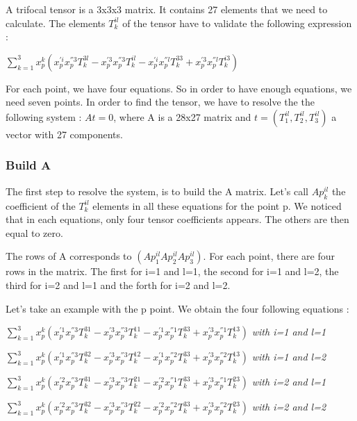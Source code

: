 \documentclass{report}
\begin{document}
A trifocal tensor is a 3x3x3 matrix. It contains 27 elements that we need to calculate. The elements $T_{k}^{il}$ of the tensor have to validate the following expression : 
\begin{center}
 $ \displaystyle { \sum_{k = 1}^{3}} x_{p}^{k}(x_{p}^{'i}x_{p}^{''3}T_{k}^{3l} - x_{p}^{'3}x_{p}^{''3}T_{k}^{il} - x_{p}^{'i}x_{p}^{''l}T_{k}^{33} + x_{p}^{'3}x_{p}^{''l}T_{k}^{i3})$ 
\end{center}
For each point, we have four equations. So in order to have enough equations, we need seven points. 
In order to find the tensor, we have to resolve the the following system : $At = 0$, where A is a 28x27 matrix and $t = ( T_{1}^{il}, T_{2}^{il}, T_{3}^{il})$ a vector with 27 components.

\subsubsection{Build A}
The first step to resolve the system, is to build the A matrix. Let's call $Ap_{k}^{il}$ the coefficient of the $T_{k}^{il}$ elements in all these equations for the point p. We noticed that in each equations, only four tensor coefficients appears. The others are then equal to zero. 

The rows of A corresponds to $( Ap_{1}^{il}  Ap_{2}^{il}  Ap_{3}^{il} )$.
For each point, there are four rows in the matrix. The first for i=1 and l=1, the second for i=1 and l=2, the third for i=2 and l=1 and the forth for i=2 and l=2.


Let's take an example with the p point. 
We obtain the four following equations : 
\begin{center}
 $ \displaystyle { \sum_{k = 1}^{3}} x_{p}^{k}(x_{p}^{'1}x_{p}^{''3}T_{k}^{31} - x_{p}^{'3}x_{p}^{''3}T_{k}^{11} - x_{p}^{'1}x_{p}^{''1}T_{k}^{33} + x_{p}^{'3}x_{p}^{''1}T_{k}^{13})$  \textit{with i=1 and l=1}
\end{center}
\begin{center}
 $ \displaystyle { \sum_{k = 1}^{3}} x_{p}^{k}(x_{p}^{'1}x_{p}^{''3}T_{k}^{32} - x_{p}^{'3}x_{p}^{''3}T_{k}^{12} - x_{p}^{'1}x_{p}^{''2}T_{k}^{33} + x_{p}^{'3}x_{p}^{''2}T_{k}^{13})$  \textit{with i=1 and l=2} 
\end{center}
\begin{center}
 $ \displaystyle { \sum_{k = 1}^{3}} x_{p}^{k}(x_{p}^{'2}x_{p}^{''3}T_{k}^{31} - x_{p}^{'3}x_{p}^{''3}T_{k}^{21} - x_{p}^{'2}x_{p}^{''1}T_{k}^{33} + x_{p}^{'3}x_{p}^{''1}T_{k}^{23})$  \textit{with i=2 and l=1} 
\end{center}
\begin{center}
 $ \displaystyle { \sum_{k = 1}^{3}} x_{p}^{k}(x_{p}^{'2}x_{p}^{''3}T_{k}^{32} - x_{p}^{'3}x_{p}^{''3}T_{k}^{22} - x_{p}^{'2}x_{p}^{''2}T_{k}^{33} + x_{p}^{'3}x_{p}^{''2}T_{k}^{23})$  \textit{with i=2 and l=2} 
\end{center}
\end{document}
